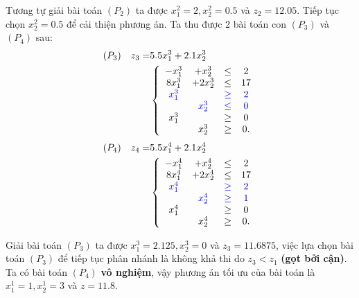 \documentclass[12pt,a4paper]{report}
\begin{document}
    Tương tự giải bài toán $(P_2)$ ta được $x^2_1 = 2, x^2_2 = 0.5$ và $z_2=12.05$. Tiếp tục chọn $x^2_2 = 0.5$ để cải thiện phương án. Ta thu được 2 bài toán con $(P_3)$ và $(P_4)$ sau:
    \begin{equation*}
        \begin{split}
            (P_3) \quad z_3= & 5.5x^3_1 + 2.1x^3_2 \\
            & \left\{\begin{array} {cccc}
             -x^3_1 &+ x^3_2 &\leq& 2 \\
             8x^3_1 &+ 2x^3_2 &\leq& 17 \\
             \color{blue} x^3_1&& \color{blue}\geq &\color{blue}2 \\
             &\color{blue} x^3_2& \color{blue}\leq& \color{blue}0 \\
            x^3_1 &&\geq &0 \\
            &x^3_2 &\geq &0. \\
            \end{array}\right. \\
        \end{split}
    \end{equation*}
   \begin{equation*}
        \begin{split}
            (P_4) \quad z_4= & 5.5x^4_1 + 2.1x^4_2  \\
            & \left\{\begin{array} {cccc}
             -x^4_1 &+ x^4_2 &\leq& 2 \\
             8x^4_1 &+ 2x^4_2 &\leq& 17 \\
             \color{blue} x^4_1 &&\color{blue}\geq& \color{blue}2 \\
             &\color{blue} x^4_2 &\color{blue}\geq&\color{blue} 1 \\
            x^4_1 &&\geq& 0 \\
            &x^4_2 &\geq& 0. \\
            \end{array}\right. \\
        \end{split}
    \end{equation*}

    Giải bài toán $(P_3)$ ta được $x^3_1=2.125, x^3_2=0$ và $z_3=11.6875$, việc lựa chọn bài toán $(P_3)$ để tiếp tục phân nhánh là không khả thi do $z_3 < z_1$ \textbf{(gọt bởi cận)}. Ta có bài toán $(P_4)$ \textbf{vô nghiệm}, vậy phương án tối ưu của bài toán là $x^1_1=1, x^1_2=3$ và $z=11.8$.
\end{document}
